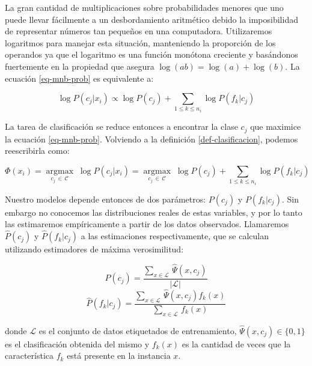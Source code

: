 La gran cantidad de multiplicaciones sobre probabilidades menores que uno puede llevar fácilmente a un desbordamiento aritmético debido la imposibilidad de representar números tan pequeños en una computadora. Utilizaremos logaritmos para manejar esta situación, manteniendo la proporción de los operandos ya que el logaritmo es una función monótona creciente y basándonos fuertemente en la propiedad que asegura $\log(ab) = \log(a) + \log(b)$. La ecuación \ref{eq-mnb-prob} es equivalente a:

\begin{equation}
\log P(c_j|x_i) \propto \log P(c_j) + \sum_{1\leq k \leq n_i} \log P(f_k|c_j)
\end{equation}

La tarea de clasificación se reduce entonces a encontrar la clase $c_j$ que maximice la ecuación \ref{eq-mnb-prob}. Volviendo a la definición \ref{def-clasificacion}, podemos reescribirla como:

\begin{definition}
\begin{equation}
    \Phi(x_i) = \operatorname*{argmax}_{c_j \, \in \, \mathcal{C}} \; \log P(c_j|x_i) = \operatorname*{argmax}_{c_j \, \in \, \mathcal{C}} \; \log P(c_j) + \sum_{1\leq k \leq n_i} \log P(f_k|c_j)
\end{equation}
\end{definition}

Nuestro modelos depende entonces de dos parámetros: $P(c_j)$ y $P(f_k|c_j)$. Sin embargo no conocemos las distribuciones reales de estas variables, y por lo tanto las estimaremos empíricamente a partir de los datos observados. Llamaremos $\hat{P}(c_j)$ y $\hat{P}(f_k|c_j)$ a las estimaciones respectivamente, que se calculan utilizando estimadores de máxima verosimilitud:

\begin{equation}
\hat{P}(c_j) = \frac{\sum_{x \in \mathcal{L}} \, \hat{\Psi}(x, c_j)}{|\mathcal{L}|}
\end{equation}
\begin{equation}\label{sin-smooth}
\hat{P}(f_k|c_j) = \frac{\sum_{x \in \mathcal{L}} \, \hat{\Psi}(x, c_j) f_k(x)}{\sum_{x \in \mathcal{L}} \, f_k(x)}
\end{equation}

donde $\mathcal{L}$ es el conjunto de datos etiquetados de entrenamiento, $\hat{\Psi}(x, c_j) \in \{0,1\}$ es el clasificación obtenida del mismo y $f_k(x)$ es la cantidad de veces que la característica $f_k$ está presente en la instancia $x$.

